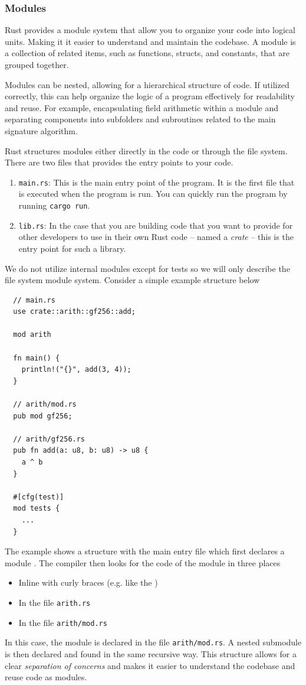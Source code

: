 \documentclass[twoside,11pt]{report}
\theoremstyle{definition}
\theoremstyle{plain}
\begin{document}
\subsubsection{Modules}
Rust provides a module system that allow you to organize your code into logical units. Making it it easier to understand and maintain the codebase. A module is a collection of related items, such as functions, structs, and constants, that are grouped together.

Modules can be nested, allowing for a hierarchical structure of code.
If utilized correctly, this can help organize the logic of a program effectively for readability and reuse. For example, encapsulating field arithmetic within a module and separating components into subfolders and subroutines related to the main signature algorithm.

Rust structures modules either directly in the code or through the file system. There are two files that provides the entry points to your code.
\begin{enumerate}
  \item \texttt{main.rs}: This is the main entry point of the program. It is the first file that is executed when the program is run. You can quickly run the program by running \texttt{cargo run}.
  \item \texttt{lib.rs}: In the case that you are building code that you want to provide for other developers to use in their own Rust code -- named a \textit{crate} -- this is the entry point for such a library.
\end{enumerate}
We do not utilize internal modules except for tests so we will only describe the file system module system. Consider a simple example structure below
\begin{verbatim}
  // main.rs
  use crate::arith::gf256::add;

  mod arith

  fn main() {
    println!("{}", add(3, 4));
  }

  // arith/mod.rs
  pub mod gf256;

  // arith/gf256.rs
  pub fn add(a: u8, b: u8) -> u8 {
    a ^ b
  }

  #[cfg(test)]
  mod tests {
    ...
  }
\end{verbatim}
The example shows a structure with the main entry file which first declares a module . The compiler then looks for the code of the module in three places
\begin{itemize}[parsep=0pt, itemsep=0pt]
  \item Inline with curly braces (e.g. like the )
  \item In the file \texttt{arith.rs}
  \item In the file \texttt{arith/mod.rs}
\end{itemize}
In this case, the module  is declared in the file \texttt{arith/mod.rs}. A nested submodule  is then declared and found in the same recursive way. This structure allows for a clear \textit{separation of concerns} and makes it easier to understand the codebase and reuse code as modules.
\end{document}
